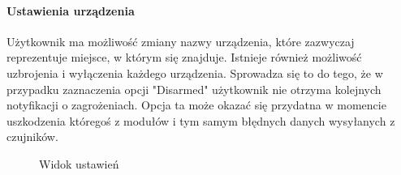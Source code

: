 \paragraph{Ustawienia urządzenia}
Użytkownik ma możliwość zmiany nazwy urządzenia, które zazwyczaj reprezentuje miejsce, w którym się znajduje. Istnieje również możliwość uzbrojenia i wyłączenia każdego urządzenia. Sprowadza się to do tego, że w przypadku zaznaczenia opcji "Disarmed"  użytkownik nie otrzyma kolejnych notyfikacji o zagrożeniach. Opcja ta może okazać się przydatna w momencie uszkodzenia któregoś z modułów i tym samym błędnych danych wysyłanych z czujników.
\nopagebreak
\begin{figure}[H]
    \centering
    \hfill
    \hfill
    \caption{Widok ustawień}
    \label{fig:ustawienia}
\end{figure}

